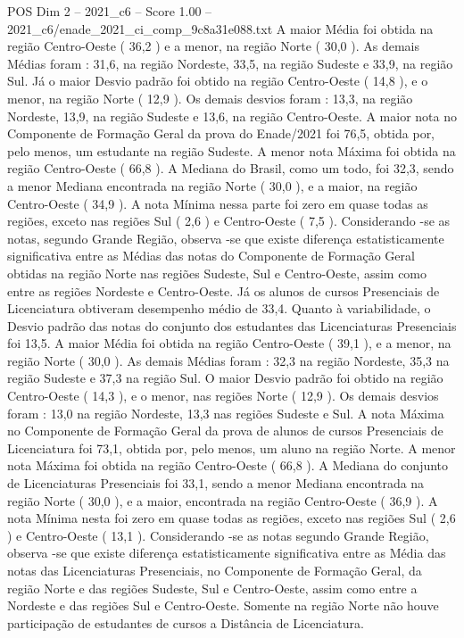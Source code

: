 \begin{textsample}{POS Dim 2 – 2021\_c6 – Score 1.00 – 2021\_c6/enade\_2021\_ci\_comp\_9c8a31e088.txt}
A maior Média foi obtida na região Centro-Oeste ( 36,2 ) e a menor, na região Norte ( 30,0 ).
As demais Médias foram : 31,6, na região Nordeste, 33,5, na região Sudeste e 33,9, na região Sul.
Já o maior Desvio padrão foi obtido na região Centro-Oeste ( 14,8 ), e o menor, na região Norte ( 12,9 ).
Os demais desvios foram : 13,3, na região Nordeste, 13,9, na região Sudeste e 13,6, na região Centro-Oeste.
A maior nota no Componente de Formação Geral da prova do Enade/2021 foi 76,5, obtida por, pelo menos, um estudante na região Sudeste.
A menor nota Máxima foi obtida na região Centro-Oeste ( 66,8 ).
A Mediana do Brasil, como um todo, foi 32,3, sendo a menor Mediana encontrada na região Norte ( 30,0 ), e a maior, na região Centro-Oeste ( 34,9 ).
A nota Mínima nessa parte foi zero em quase todas as regiões, exceto nas regiões Sul ( 2,6 ) e Centro-Oeste ( 7,5 ).
Considerando -se as notas, segundo Grande Região, observa -se que existe diferença estatisticamente significativa entre as Médias das notas do Componente de Formação Geral obtidas na região Norte nas regiões Sudeste, Sul e Centro-Oeste, assim como entre as regiões Nordeste e Centro-Oeste.
Já os alunos de cursos Presenciais de Licenciatura obtiveram desempenho médio de 33,4.
Quanto à variabilidade, o Desvio padrão das notas do conjunto dos estudantes das Licenciaturas Presenciais foi 13,5.
A maior Média foi obtida na região Centro-Oeste ( 39,1 ), e a menor, na região Norte ( 30,0 ).
As demais Médias foram : 32,3 na região Nordeste, 35,3 na região Sudeste e 37,3 na região Sul.
O maior Desvio padrão foi obtido na região Centro-Oeste ( 14,3 ), e o menor, nas regiões Norte ( 12,9 ).
Os demais desvios foram : 13,0 na região Nordeste, 13,3 nas regiões Sudeste e Sul.
A nota Máxima no Componente de Formação Geral da prova de alunos de cursos Presenciais de Licenciatura foi 73,1, obtida por, pelo menos, um aluno na região Norte.
A menor nota Máxima foi obtida na região Centro-Oeste ( 66,8 ).
A Mediana do conjunto de Licenciaturas Presenciais foi 33,1, sendo a menor Mediana encontrada na região Norte ( 30,0 ), e a maior, encontrada na região Centro-Oeste ( 36,9 ).
A nota Mínima nesta foi zero em quase todas as regiões, exceto nas regiões Sul ( 2,6 ) e Centro-Oeste ( 13,1 ).
Considerando -se as notas segundo Grande Região, observa -se que existe diferença estatisticamente significativa entre as Média das notas das Licenciaturas Presenciais, no Componente de Formação Geral, da região Norte e das regiões Sudeste, Sul e Centro-Oeste, assim como entre a Nordeste e das regiões Sul e Centro-Oeste.
Somente na região Norte não houve participação de estudantes de cursos a Distância de Licenciatura.

\end{textsample}
